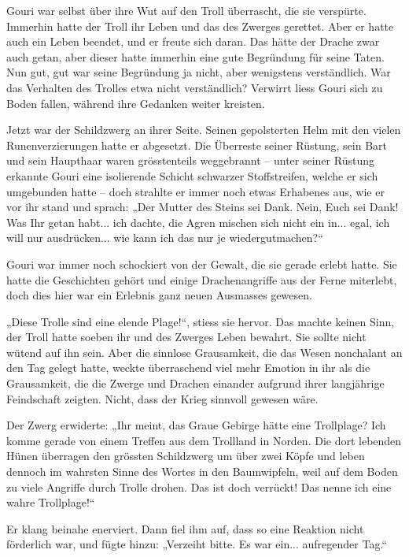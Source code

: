 Gouri war selbst über ihre Wut auf den Troll überrascht, die sie verspürte. Immerhin hatte der Troll ihr Leben und das des Zwerges gerettet. Aber er hatte auch ein Leben beendet, und er freute sich daran. Das hätte der Drache zwar auch getan, aber dieser hatte immerhin eine gute Begründung für seine Taten. Nun gut, gut war seine Begründung ja nicht, aber wenigstens verständlich. War das Verhalten des Trolles etwa nicht verständlich? Verwirrt liess Gouri sich zu Boden fallen, während ihre Gedanken weiter kreisten.

Jetzt war der Schildzwerg an ihrer Seite. Seinen gepolsterten Helm mit den vielen Runenverzierungen hatte er abgesetzt. Die Überreste seiner Rüstung, sein Bart und sein Haupthaar waren grösstenteils weggebrannt – unter seiner Rüstung erkannte Gouri eine isolierende Schicht schwarzer Stoffstreifen, welche er sich umgebunden hatte – doch strahlte er immer noch etwas Erhabenes aus, wie er vor ihr stand und sprach: „Der Mutter des Steins sei Dank. Nein, Euch sei Dank! Was Ihr getan habt... ich dachte, die Agren mischen sich nicht ein in... egal, ich will nur ausdrücken... wie kann ich das nur je wiedergutmachen?“

Gouri war immer noch schockiert von der Gewalt, die sie gerade erlebt hatte. Sie hatte die Geschichten gehört und einige Drachenangriffe aus der Ferne miterlebt, doch dies hier war ein Erlebnis ganz neuen Ausmasses gewesen.

„Diese Trolle sind eine elende Plage!“, stiess sie hervor. Das machte keinen Sinn, der Troll hatte soeben ihr und des Zwerges Leben bewahrt. Sie sollte nicht wütend auf ihn sein. Aber die sinnlose Grausamkeit, die das Wesen nonchalant an den Tag gelegt hatte, weckte überraschend viel mehr Emotion in ihr als die Grausamkeit, die die Zwerge und Drachen einander aufgrund ihrer langjährige Feindschaft zeigten. Nicht, dass der Krieg sinnvoll gewesen wäre.

Der Zwerg erwiderte: „Ihr meint, das Graue Gebirge hätte eine Trollplage? Ich komme gerade von einem Treffen aus dem Trollland in Norden. Die dort lebenden Hünen überragen den grössten Schildzwerg um über zwei Köpfe und leben dennoch im wahrsten Sinne des Wortes in den Baumwipfeln, weil auf dem Boden zu viele Angriffe durch Trolle drohen. Das ist doch verrückt! Das nenne ich eine wahre Trollplage!“

Er klang beinahe enerviert. Dann fiel ihm auf, dass so eine Reaktion nicht förderlich war, und fügte hinzu: „Verzeiht bitte. Es war ein... aufregender Tag.“

